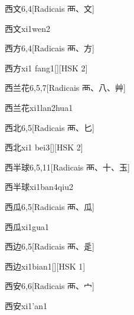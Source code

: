 \begin{entry}{西文}{6,4}[Radicais ⾑、⽂]
  \begin{phonetics}{西文}{xi1wen2}
  \end{phonetics}
\end{entry}

\begin{entry}{西方}{6,4}[Radicais ⾑、⽅]
  \begin{phonetics}{西方}{xi1 fang1}[][HSK 2]
  \end{phonetics}
\end{entry}

\begin{entry}{西兰花}{6,5,7}[Radicais ⾑、⼋、⾋]
  \begin{phonetics}{西兰花}{xi1lan2hua1}
  \end{phonetics}
\end{entry}

\begin{entry}{西北}{6,5}[Radicais ⾑、⼔]
  \begin{phonetics}{西北}{xi1 bei3}[][HSK 2]
  \end{phonetics}
\end{entry}

\begin{entry}{西半球}{6,5,11}[Radicais ⾑、⼗、⽟]
  \begin{phonetics}{西半球}{xi1ban4qiu2}
  \end{phonetics}
\end{entry}

\begin{entry}{西瓜}{6,5}[Radicais ⾑、⽠]
  \begin{phonetics}{西瓜}{xi1gua1}
  \end{phonetics}
\end{entry}

\begin{entry}{西边}{6,5}[Radicais ⾑、⾡]
  \begin{phonetics}{西边}{xi1bian1}[][HSK 1]
  \end{phonetics}
\end{entry}

\begin{entry}{西安}{6,6}[Radicais ⾑、⼧]
  \begin{phonetics}{西安}{xi1'an1}
  \end{phonetics}
\end{entry}

